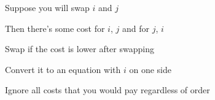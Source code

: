 Suppose you will swap $i$ and $j$

Then there's some cost for $i$, $j$ and for $j$, $i$

Swap if the cost is lower after swapping

Convert it to an equation with $i$ on one side

Ignore all costs that you would pay regardless of order